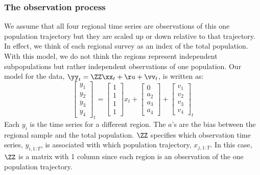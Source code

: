 \subsubsection{The observation process}
We assume that all four regional time series are observations of this one population trajectory but they are scaled up or down relative to that trajectory.   In effect, we think of each regional survey as an index of the total population.  With this model, we do not think the regions represent independent subpopulations but rather independent observations of one population.
Our model for the data, $\yy_t = \ZZ \xx_t + \aa + \vv_t$, is written as:
\begin{equation}
 \left[ \begin{array}{c}
    y_{1} \\
    y_{2} \\
    y_{3} \\
    y_{4}  \end{array} \right]_t = 
    \left[ \begin{array}{c}
    1\\
    1\\
    1\\
    1\end{array} \right] x_t +  
    \left[ \begin{array}{c}
    0 \\
    a_2 \\
    a_3 \\
    a_4  \end{array} \right] + 
    \left[ \begin{array}{c}
    v_{1} \\
    v_{2} \\
    v_{3} \\
    v_{4}  \end{array} \right]_t 
 \label{eq:meas}\end{equation}
Each $y_{i}$ is the time series for a different region.  The $a$'s are the bias between the regional sample and the total population.  $\ZZ$ specifies which observation time series, $y_{i,1:T}$, is associated with which population trajectory, $x_{j,1:T}$.  In this case, $\ZZ$ is a matrix with 1 column since each region is an observation of the one population trajectory.


